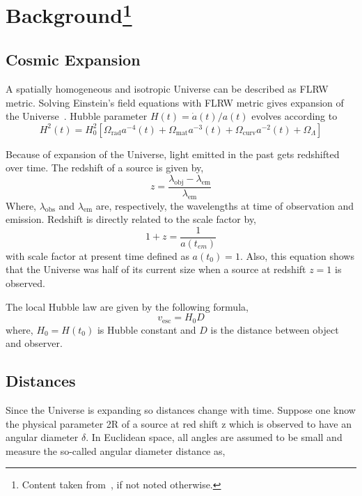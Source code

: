 \section[Background]{Background\footnote{Content taken from~\cite{manual}, if not noted otherwise.}}
\subsection{Cosmic Expansion}
A spatially homogeneous and isotropic Universe can be described as FLRW metric. Solving Einstein's field equations with FLRW metric gives expansion of the Universe~\cite{TEU}. Hubble parameter $H(t)=\dot{a}(t)/a(t)$ evolves according to
\begin{equation}
H^2(t) = H_0^2 \left[ \Omega_\text{rad} a^{-4}(t) + \Omega_\text{mat}a^{-3}(t) + \Omega_\text{curv}a^{-2} (t) + \Omega_\Lambda \right]
\end{equation}

Because of expansion of the Universe, light emitted in the past gets redshifted over time. The redshift of a source is given by,
\begin{equation}
z=\frac{\lambda_\text{obj}-\lambda_\text{em}}{\lambda_\text{em}}
\label{math:z}
\end{equation}
\noindent
Where, $\lambda_\text{obs}$ and $\lambda_\text{em}$ are, respectively, the wavelengths at time of observation and emission.
Redshift is directly related to the scale factor by,
\begin{equation}
1+z=\frac{1}{a(t_{em})}
\end{equation}
with scale factor at present time defined as $a(t_0) = 1$. Also, this equation shows that the Universe was half of its current size when a source at redshift $z= 1$ is observed.

The local Hubble law are given by the following formula,\\
\begin{equation}
v_\text{esc}=H_{0}D
\label{Hubble}
\end{equation}
where, $H_{0} = H(t_0)$ is Hubble constant and $D$ is the distance between object and observer.

\subsection{Distances}
Since the Universe is expanding so distances change with time. Suppose one know the physical parameter 2$\text{R} $ of a source at red shift $\text{z}$ which is observed to have an angular diameter $ \delta $. In Euclidean space, all angles are assumed to be small and measure the so-called angular diameter distance as,


